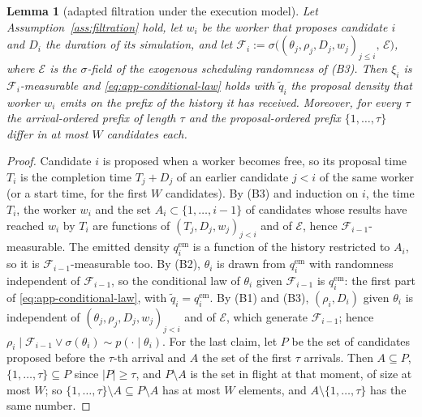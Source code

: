 \documentclass[10pt]{article}
\theoremstyle{plain}
\newtheorem{lemma}[theorem]{Lemma}
\theoremstyle{definition}
\begin{document}
\begin{lemma}[adapted filtration under the execution model]\label{lem:adapted}
Let Assumption~\ref{ass:filtration} hold, let $w_i$ be the worker that proposes candidate $i$ and $D_i$ the duration of its simulation, and let $\mathcal{F}_i:=\sigma\bigl((\theta_j,\rho_j,D_j,w_j)_{j\le i},\,\mathcal{E}\bigr)$, where $\mathcal{E}$ is the $\sigma$-field of the exogenous scheduling randomness of (B3). Then $\xi_i$ is $\mathcal{F}_i$-measurable and \eqref{eq:app-conditional-law} holds with $\tilde q_i$ the proposal density that worker $w_i$ emits on the prefix of the history it has received. Moreover, for every $\tau$ the arrival-ordered prefix of length $\tau$ and the proposal-ordered prefix $\{1,\dots,\tau\}$ differ in at most $W$ candidates each.
\end{lemma}
\begin{proof}
Candidate $i$ is proposed when a worker becomes free, so its proposal time $T_i$ is the completion time $T_j+D_j$ of an earlier candidate $j<i$ of the same worker (or a start time, for the first $W$ candidates). By (B3) and induction on $i$, the time $T_i$, the worker $w_i$ and the set $A_i\subset\{1,\dots,i-1\}$ of candidates whose results have reached $w_i$ by $T_i$ are functions of $(T_j,D_j,w_j)_{j<i}$ and of $\mathcal{E}$, hence $\mathcal{F}_{i-1}$-measurable. The emitted density $q^{\mathrm{em}}_i$ is a function of the history restricted to $A_i$, so it is $\mathcal{F}_{i-1}$-measurable too. By (B2), $\theta_i$ is drawn from $q^{\mathrm{em}}_i$ with randomness independent of $\mathcal{F}_{i-1}$, so the conditional law of $\theta_i$ given $\mathcal{F}_{i-1}$ is $q^{\mathrm{em}}_i$: the first part of \eqref{eq:app-conditional-law}, with $\tilde q_i=q^{\mathrm{em}}_i$. By (B1) and (B3), $(\rho_i,D_i)$ given $\theta_i$ is independent of $(\theta_j,\rho_j,D_j,w_j)_{j<i}$ and of $\mathcal{E}$, which generate $\mathcal{F}_{i-1}$; hence $\rho_i\mid\mathcal{F}_{i-1}\vee\sigma(\theta_i)\sim p(\cdot\mid\theta_i)$. For the last claim, let $P$ be the set of candidates proposed before the $\tau$-th arrival and $A$ the set of the first $\tau$ arrivals. Then $A\subseteq P$, $\{1,\dots,\tau\}\subseteq P$ since $|P|\ge\tau$, and $P\setminus A$ is the set in flight at that moment, of size at most $W$; so $\{1,\dots,\tau\}\setminus A\subseteq P\setminus A$ has at most $W$ elements, and $A\setminus\{1,\dots,\tau\}$ has the same number.
\end{proof}
\end{document}
